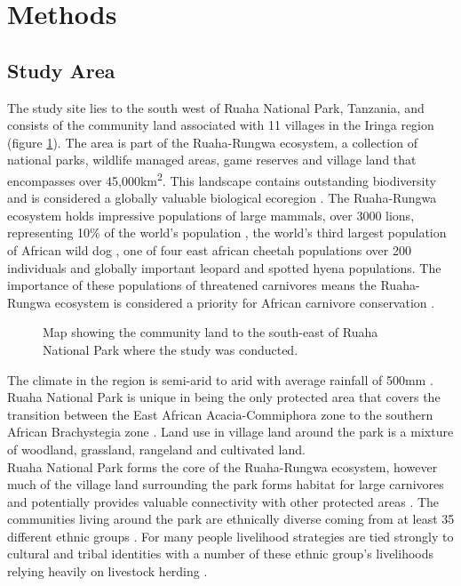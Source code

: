 \section{Methods}
\subsection{Study Area}
The study site lies to the south west of Ruaha National Park, Tanzania, and consists of the community land associated with 11 villages in the Iringa region (figure \ref{fig:area_map}). The area is part of the Ruaha-Rungwa ecosystem, a collection of national parks, wildlife managed areas, game reserves and village land that encompasses over 45,000km\textsuperscript{2}. This landscape contains outstanding biodiversity and is considered a globally valuable biological ecoregion \cite{Olson_1998}. The Ruaha-Rungwa ecosystem holds impressive populations of large mammals, over 3000 lions, representing 10\% of the world's population \cite{Riggio_2012}, the world's third largest population of African wild dog \cite{iucn2007regional}, one of four east african cheetah populations over 200 individuals \cite{iucn2007regional} and globally important leopard and spotted hyena populations. The importance of these populations of threatened carnivores means the Ruaha-Rungwa ecosystem is considered a priority for African carnivore conservation \cite{mills2001geographic}.\\

\begin{figure}[htb]
\centering
\setlength\fboxsep{0pt}
\setlength\fboxrule{0.5pt}
\caption{Map showing the community land to the south-east of Ruaha National Park where the study was conducted.}
\label{fig:area_map}
\end{figure}

The climate in the region is semi-arid to arid with average rainfall of 500mm \cite{dickman2008}. Ruaha National Park is unique in being the only protected area that covers the transition between the East African Acacia-Commiphora zone to the southern African Brachystegia zone \cite{Barnes_1982}. Land use in village land around the park is a mixture of woodland, grassland, rangeland and cultivated land.\\

Ruaha National Park forms the core of the Ruaha-Rungwa ecosystem, however much of the village land surrounding the park forms habitat for large carnivores and potentially provides valuable connectivity with other protected areas \cite{Abade2014a}. The communities living around the park are ethnically diverse coming from at least 35 different ethnic groups \cite{williams2007people}. For many people livelihood strategies are tied strongly to cultural and tribal identities \cite{williams2007people,dickman2008} with a number of these ethnic group's livelihoods relying heavily on livestock herding \cite{dickman2008}.\\

